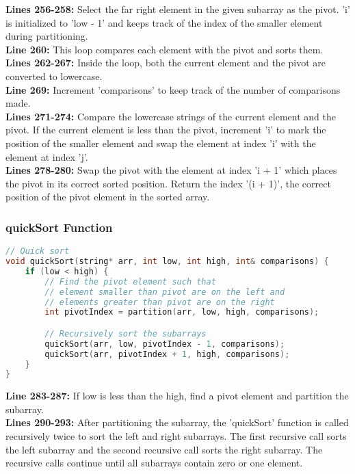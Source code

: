 \documentclass[letterpaper, 10pt,DIV=13]{scrartcl}
\numberwithin{equation}{section} %
\numberwithin{figure}{section} %
\numberwithin{table}{section} %
\begin{document}
\textbf{Lines 256-258:} Select the far right element in the given subarray as the pivot. 'i' is initialized to 'low - 1' and keeps track of the index of the smaller element during partitioning. \\
\textbf{Line 260:} This loop compares each element with the pivot and sorts them. \\
\textbf{Lines 262-267:} Inside the loop, both the current element and the pivot are converted to lowercase. \\
\textbf{Line 269:} Increment 'comparisons' to keep track of the number of comparisons made. \\
\textbf{Lines 271-274:} Compare the lowercase strings of the current element and the pivot. If the current element is less than the pivot, increment 'i' to mark the position of the smaller element and swap the element at index 'i' with the element at index 'j'. \\
\textbf{Lines 278-280:} Swap the pivot with the element at index 'i + 1' which places the pivot in its correct sorted position. Return the index '(i + 1)', the correct position of the pivot element in the sorted array.

\subsubsection{quickSort Function}
\begin{linenumbers}
\begin{lstlisting}[language=C++, caption={quickSort Function}, label={code:example}]
// Quick sort
void quickSort(string* arr, int low, int high, int& comparisons) {
    if (low < high) {
        // Find the pivot element such that
        // element smaller than pivot are on the left and
        // elements greater than pivot are on the right
        int pivotIndex = partition(arr, low, high, comparisons);

        // Recursively sort the subarrays
        quickSort(arr, low, pivotIndex - 1, comparisons);
        quickSort(arr, pivotIndex + 1, high, comparisons);
    }
}
\end{lstlisting}
\end{linenumbers}
\nolinenumbers

\textbf{Line 283-287:} If low is less than the high, find a pivot element and partition the subarray. \\
\textbf{Lines 290-293:} After partitioning the subarray, the 'quickSort' function is called recursively twice to sort the left and right subarrays. The first recursive call sorts the left subarray and the second recursive call sorts the right subarray. The recursive calls continue until all subarrays contain zero or one element.
\end{document}
